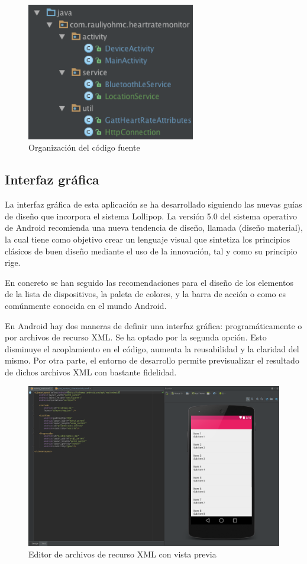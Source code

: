  \begin{figure}[h] \centering
    \includegraphics[height=6cm]{graphs/srctree.png} \caption{Organización del código fuente}\label{fig:srctree}
\end{figure}
 
\subsection{Interfaz gráfica} 

    La interfaz gráfica de esta aplicación se ha desarrollado siguiendo las nuevas guías de diseño que incorpora el sistema Lollipop. La versión 5.0 del sistema operativo de Android recomienda una nueva tendencia de diseño, llamada  (diseño material), la cual tiene como objetivo crear un lenguaje visual que sintetiza los principios clásicos de buen diseño mediante el uso de la innovación, tal y como su principio rige.

    En concreto se han seguido las recomendaciones para el diseño de los elementos de la lista de dispositivos, la paleta de colores, y la barra de acción o  como es comúnmente conocida en el mundo Android.

    En Android hay dos maneras de definir una interfaz gráfica: programáticamente o por archivos de recurso XML. Se ha optado por la segunda opción. Esto disminuye el acoplamiento en el código, aumenta la reusabilidad y la claridad del mismo. Por otra parte, el entorno de desarrollo permite previsualizar el resultado de dichos archivos XML con bastante fidelidad.

 \begin{figure}[h] \centering
    \includegraphics[width=15cm]{graphs/layoutedit.png} \caption{Editor de archivos de recurso XML con vista previa}\label{fig:layoutedit}
\end{figure}

